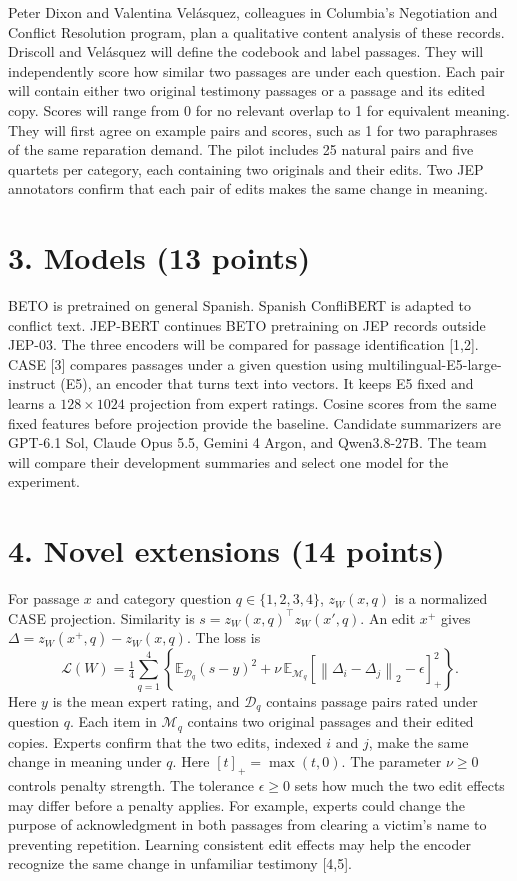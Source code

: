 \documentclass[11pt,letterpaper]{article}
\newcommand{\norm}[1]{\left\lVert#1\right\rVert_2}
\begin{document}
Peter Dixon and Valentina Vel\'asquez, colleagues in Columbia's Negotiation and Conflict Resolution program, plan a qualitative content analysis of these records. Driscoll and Vel\'asquez will define the codebook and label passages. They will independently score how similar two passages are under each question. Each pair will contain either two original testimony passages or a passage and its edited copy. Scores will range from 0 for no relevant overlap to 1 for equivalent meaning. They will first agree on example pairs and scores, such as 1 for two paraphrases of the same reparation demand. The pilot includes 25 natural pairs and five quartets per category, each containing two originals and their edits. Two JEP annotators confirm that each pair of edits makes the same change in meaning.

\section{3. Models (13 points)}
BETO is pretrained on general Spanish. Spanish ConfliBERT is adapted to conflict text. JEP-BERT continues BETO pretraining on JEP records outside JEP-03. The three encoders will be compared for passage identification [1,2]. CASE [3] compares passages under a given question using multilingual-E5-large-instruct (E5), an encoder that turns text into vectors. It keeps E5 fixed and learns a \(128\times1024\) projection from expert ratings. Cosine scores from the same fixed features before projection provide the baseline. Candidate summarizers are GPT-6.1 Sol, Claude Opus 5.5, Gemini 4 Argon, and Qwen3.8-27B. The team will compare their development summaries and select one model for the experiment.

\section{4. Novel extensions (14 points)}
For passage \(x\) and category question \(q\in\{1,2,3,4\}\), \(z_W(x,q)\) is a normalized CASE projection. Similarity is \(s=z_W(x,q)^\top z_W(x',q)\). An edit \(x^+\) gives \(\Delta=z_W(x^+,q)-z_W(x,q)\). The loss is
\[
\mathcal L(W)=\tfrac14\sum_{q=1}^{4}
\left\{\mathbb E_{\mathcal D_q}(s-y)^2+
\nu\,\mathbb E_{\mathcal M_q}
\left[\norm{\Delta_i-\Delta_j}-\epsilon\right]_+^2\right\}.
\]
Here \(y\) is the mean expert rating, and \(\mathcal D_q\) contains passage pairs rated under question \(q\). Each item in \(\mathcal M_q\) contains two original passages and their edited copies. Experts confirm that the two edits, indexed \(i\) and \(j\), make the same change in meaning under \(q\). Here \([t]_+=\max(t,0)\). The parameter \(\nu\ge0\) controls penalty strength. The tolerance \(\epsilon\ge0\) sets how much the two edit effects may differ before a penalty applies. For example, experts could change the purpose of acknowledgment in both passages from clearing a victim's name to preventing repetition. Learning consistent edit effects may help the encoder recognize the same change in unfamiliar testimony [4,5].
\end{document}
